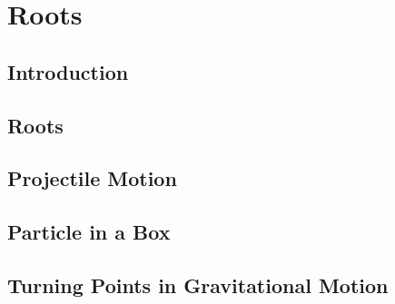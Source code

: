 \chapter{Roots}

\section{Introduction}

\section{Roots}

\section{Projectile Motion}

\section{Particle in a Box}

\section{Turning Points in Gravitational Motion}



